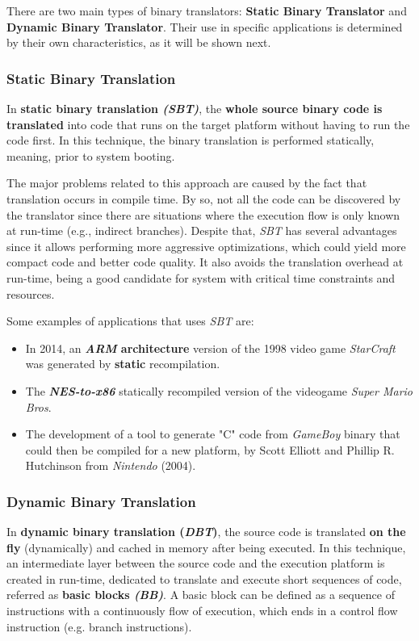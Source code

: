 \documentclass[12pt]{article}
\begin{document}
{There are two main types of binary translators: \textbf{Static Binary Translator} and \textbf{Dynamic Binary Translator}. Their use in specific applications is determined by their own characteristics, as it will be shown next. 

\subsubsection{Static \textit{}Binary Translation}

In \textbf{static binary translation \textit{(SBT)}}, the \textbf{whole source binary code is translated} into code that runs on the target platform without having to run the code first. In this technique, the binary translation is performed statically, meaning, prior to system booting. \cite{DBT1}

The major problems related to this approach are caused by the fact that translation occurs in compile time. By so, not all the code can be discovered by the translator since there are situations where the execution flow is only known at run-time (e.g., indirect branches). Despite that, \textit{SBT} has several advantages since it allows performing more aggressive optimizations, which could yield more compact code and better code quality. It also avoids the translation overhead at run-time, being a good candidate for system with critical time constraints and resources. \cite{Shen:2014:RSB:2639036.2629335}

Some examples of applications that uses \textit{SBT} are:
\begin{itemize}
  \item In 2014, an \textbf{\textit{ARM} architecture} version of the 1998 video game \textit{StarCraft} was generated by \textbf{static} recompilation. 
  \item The \textbf{\textit{NES-to-x86}} statically recompiled version of the videogame \textit{Super Mario Bros}.
  \item The development of a tool to generate "C" code from \textit{GameBoy} binary that could then be compiled for a new platform, by Scott Elliott and Phillip R. Hutchinson from \textit{Nintendo} (2004). \cite{BinaryTranslation_example} 
\end{itemize}


\subsubsection{Dynamic Binary Translation}
In \textbf{dynamic binary translation (\textit{DBT})}, the source code is translated \textbf{on the fly} (dynamically) and cached in memory after being executed. In this technique, an intermediate layer between the source code and the execution platform is created in run-time, dedicated to translate and execute short sequences of code, referred as \textbf{basic blocks \textit{(BB)}}. \cite{DBT1} A basic block can be defined as a sequence of instructions with  a continuously flow of execution, which ends in a control flow instruction (e.g. branch instructions).

}
\end{document}
